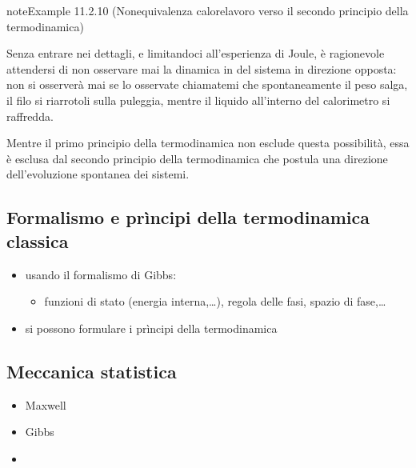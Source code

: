 \documentclass[letterpaper,10pt,italian]{jupyterBook}
\begin{document}
\begin{sphinxadmonition}{note}{Example 11.2.10 (Non\sphinxhyphen{}equivalenza calore\sphinxhyphen{}lavoro \sphinxhyphen{} verso il secondo principio della termodinamica)}



\sphinxAtStartPar
Senza entrare nei dettagli, e limitandoci all’esperienza di Joule, è ragionevole attendersi di non osservare mai la dinamica in del sistema in direzione opposta: non si osserverà mai \sphinxhyphen{} se lo osservate chiamatemi \sphinxhyphen{} che spontaneamente il peso salga, il filo si ri\sphinxhyphen{}arrotoli sulla puleggia, mentre il liquido all’interno del calorimetro si raffredda.

\sphinxAtStartPar
Mentre il primo principio della termodinamica non esclude questa possibilità, essa è esclusa dal secondo principio della termodinamica che postula una direzione dell’evoluzione spontanea dei sistemi.
\end{sphinxadmonition}


\subsection{Formalismo e prìncipi della termodinamica classica}
\label{\detokenize{ch/thermodynamics/foundation-experiments:formalismo-e-principi-della-termodinamica-classica}}
\sphinxAtStartPar
{}
\begin{itemize}
\item {} 
\sphinxAtStartPar
usando il formalismo di Gibbs:
\begin{itemize}
\item {} 
\sphinxAtStartPar
funzioni di stato (energia interna,…), regola delle fasi, spazio di fase,…

\end{itemize}

\item {} 
\sphinxAtStartPar
si possono formulare i prìncipi della termodinamica

\end{itemize}


\subsection{Meccanica statistica}
\label{\detokenize{ch/thermodynamics/foundation-experiments:meccanica-statistica}}\begin{itemize}
\item {} 
\sphinxAtStartPar
Maxwell

\item {} 
\sphinxAtStartPar
Gibbs

\item {} 
\sphinxAtStartPar
{}

\end{itemize}
\end{document}
